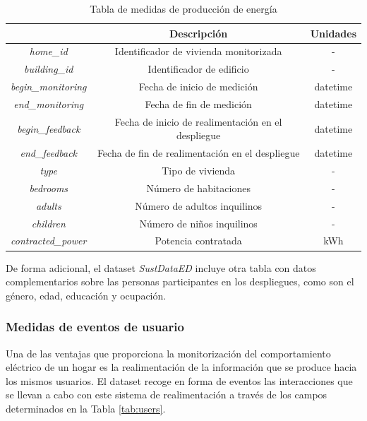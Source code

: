 \begin{table}[h!]
    \centering
    \begin{tabular}{|c|c|c|}
    \hline
    \rowcolor[HTML]{AAAAAA} 
    \multicolumn{1}{|c|}{\cellcolor[HTML]{AAAAAA}Campo} & \multicolumn{1}{c|}{\cellcolor[HTML]{AAAAAA}Descripción} & Unidades \\ \hline
    \textit{home\_id} & Identificador de vivienda monitorizada & - \\ \hline
    \textit{building\_id} & Identificador de edificio & - \\ \hline
    \textit{begin\_monitoring} & Fecha de inicio de medición & datetime \\ \hline
    \textit{end\_monitoring} & Fecha de fin de medición & datetime \\ \hline
    \textit{begin\_feedback} & Fecha de inicio de realimentación en el despliegue & datetime \\ \hline
    \textit{end\_feedback} & Fecha de fin de realimentación en el despliegue & datetime \\ \hline
    \textit{type} & Tipo de vivienda & - \\ \hline
    \textit{bedrooms} & Número de habitaciones & - \\ \hline
    \textit{adults} & Número de adultos inquilinos & - \\ \hline
    \textit{children} & Número de niños inquilinos & - \\ \hline
    \textit{contracted\_power} & Potencia contratada & kWh \\ \hline
    \end{tabular}
    \caption{Tabla de medidas de producción de energía \cite{sustdata}}
    \label{tab:demo}
\end{table}

De forma adicional, el dataset \textit{SustDataED} incluye otra tabla con datos complementarios sobre las personas participantes en los despliegues, como son el género, edad, educación y ocupación.

\subsubsection{Medidas de eventos de usuario}

Una de las ventajas que proporciona la monitorización del comportamiento eléctrico de un hogar es la realimentación de la información que se produce hacia los mismos usuarios. El dataset recoge en forma de eventos las interacciones que se llevan a cabo con este sistema de realimentación a través de los campos determinados en la Tabla \ref{tab:users}. 


